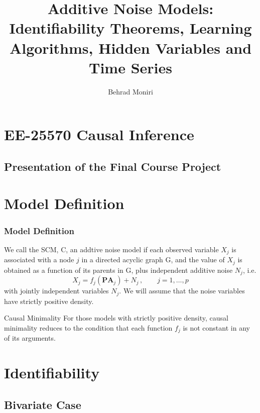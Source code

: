\documentclass{beamer}
\title[Additive Noise Models]{Additive Noise Models: Identifiability Theorems, Learning Algorithms, Hidden Variables and Time Series}
\author{Behrad Moniri}
\institute[EE @ Sharif] 
{
Sharif University of Technology \\
\medskip
\textit{bemoniri@ee.sharif.edu}
}
\date{}
\newcommand{\B}[1]{\mathbf{#1}}
\newcommand{\PA}[2][]{{\B{PA}}^{#1}_{#2}}
\begin{document}
\section{EE-25570 Causal Inference}
\subsection{Presentation of the Final Course Project}
\begin{frame}
\titlepage
\end{frame}
\section{Model Definition}
\begin{frame}
\frametitle{Model Definition}
We call the SCM, C, an addtive noise model if each observed variable
$X_j$ is associated with a node $j$ in a directed acyclic graph G, and the value of
$X_j$ is obtained as a function of its parents in G, plus independent additive noise
$N_j$, i.e.
\begin{equation} \label{eq:anm}
X_j = f_j(\PA{j}) + N_j\,, \qquad j=1, \ldots, p
\end{equation}
with jointly independent variables $N_j$. We will assume that the noise variables have strictly positive density.

\begin{alertblock}{Causal Minimality}
For those models with strictly positive density, causal minimality reduces to the condition that each function $f_j$ is not constant in any of its arguments.
\end{alertblock}
\end{frame}


\section{Identifiability}
\subsection{Bivariate Case}
\end{document}
